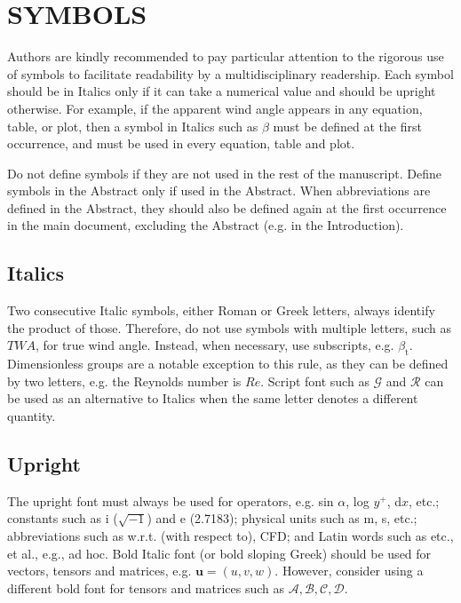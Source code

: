 \documentclass[oneside, a4paper, onecolumn, 11pt]{article}
\begin{document}
\section{SYMBOLS} \label{sec:symbols}

Authors are kindly recommended to pay particular attention to the rigorous use of symbols to facilitate readability by a multidisciplinary readership. Each symbol should be in Italics only if it can take a numerical value and should be upright otherwise. For example, if the apparent wind angle appears in any equation, table, or plot, then a symbol in Italics such as $\beta$ must be defined at the first occurrence, and must be used in every equation, table and plot.  

Do not define symbols if they are not used in the rest of the manuscript. Define symbols in the Abstract only if used in the Abstract. When abbreviations are defined in the Abstract, they should also be defined again at the first occurrence in the main document, excluding the Abstract (e.g. in the Introduction). 

\subsection{Italics}

Two consecutive Italic symbols, either Roman or Greek letters, always identify the product of those. Therefore, do not use symbols with multiple letters, such as $TWA$, for true wind angle. Instead, when necessary, use subscripts, e.g. $\beta_\text{t}$. Dimensionless groups are a notable exception to this rule, as they can be defined by two letters, e.g. the Reynolds number is $Re$. Script font such as $\mathcal{G}$ and $\mathcal{R}$ can be used as an alternative to Italics when the same letter denotes a different quantity.

\subsection{Upright}

The upright font must always be used for operators, e.g. sin $\alpha$, log $y^+$, d$x$, etc.; constants such as i ($\sqrt{-1}$) and e (2.7183); physical units such as m, s, etc.; abbreviations such as w.r.t. (with respect to), CFD; and Latin words such as etc., et al., e.g., ad hoc. 
Bold Italic font (or bold sloping Greek) should be used for vectors, tensors and matrices, e.g. $\bm{u}=(u,v,w).$ However, consider using a different bold font for tensors and matrices such as $\bm{\mathcal{A,B,C,D}}$.
\end{document}
